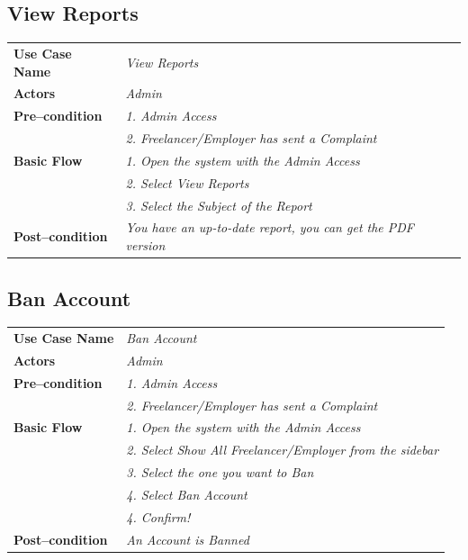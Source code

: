 \documentclass{article}
\begin{document}
\subsection{View Reports}
    \begin{tabular}{ l | l }
    \toprule
      \rowcolor{LightCyan}
      \textbf{Use Case Name}    & \textit{View Reports}\\
      \textbf{Actors}           & \textit{Admin}\\
      \rowcolor{LightCyan}
      \textbf{Pre--condition}   & \textit{1. Admin Access}\\
                                  \rowcolor{LightCyan}
                                & \textit{2. Freelancer/Employer has sent a Complaint}\\
      \textbf{Basic Flow}       & \textit{1. Open the system with the Admin Access}\\
                                & \textit{2. Select View Reports}\\
                                & \textit{3. Select the Subject of the Report}\\
      \rowcolor{LightCyan}
      \textbf{Post--condition}  & \textit{You have an up-to-date report, you can get the PDF version}\\
    \toprule
    \end{tabular}





\subsection{Ban Account}
    \begin{tabular}{ l | l }
    \toprule
      \rowcolor{LightCyan}
      \textbf{Use Case Name}    & \textit{Ban Account}\\
      \textbf{Actors}           & \textit{Admin}\\
      \rowcolor{LightCyan}
      \textbf{Pre--condition}   & \textit{1. Admin Access}\\
                                  \rowcolor{LightCyan}
                                & \textit{2. Freelancer/Employer has sent a Complaint}\\
      \textbf{Basic Flow}       & \textit{1. Open the system with the Admin Access}\\
                                & \textit{2. Select Show All Freelancer/Employer from the sidebar}\\
                                & \textit{3. Select the one you want to Ban}\\
                                & \textit{4. Select Ban Account}\\
                                & \textit{4. Confirm!}\\
      \rowcolor{LightCyan}
      \textbf{Post--condition}  & \textit{An Account is Banned}\\
    \toprule
    \end{tabular}
\end{document}
